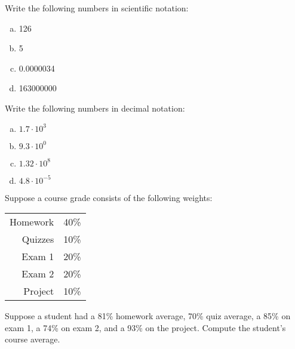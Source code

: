 \documentclass[11pt,letterpaper]{article}
\begin{document}

 Write the following numbers in scientific notation:
	\begin{enumerate}[(a)]
	\item 126
	\item 5
	\item 0.0000034
	\item 163000000
	\end{enumerate}



\newpage



 Write the following numbers in decimal notation:
	\begin{enumerate}[(a)]
	\item $1.7 \cdot 10^3$
	\item $9.3 \cdot 10^0$
	\item $1.32 \cdot 10^8$
	\item $4.8 \cdot 10^{-5}$
	\end{enumerate}



\newpage



 Suppose a course grade consists of the following weights:
	\begin{table}[!ht]
	\centering
	\begin{tabular}{rl}
	Homework & 40\% \\
	Quizzes & 10\% \\
	Exam 1 & 20\% \\
	Exam 2 & 20\% \\
	Project & 10\%
	\end{tabular}
	\end{table} \par
Suppose a student had a 81\% homework average, 70\% quiz average, a 85\% on exam 1, a 74\% on exam 2, and a 93\% on the project. Compute the student's course average.



\newpage
\end{document}
